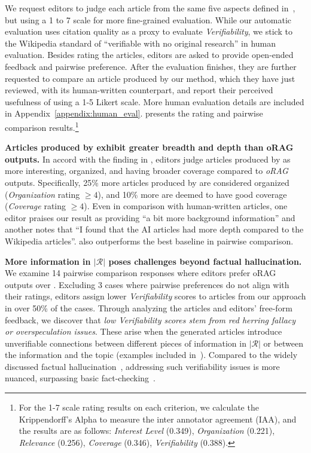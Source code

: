 We request editors to judge each article from the same five aspects defined in~, but using a 1 to 7 scale for more fine-grained evaluation. While our automatic evaluation uses citation quality as a proxy to evaluate \textit{Verifiability}, we stick to the Wikipedia standard of ``verifiable with no original research'' in human evaluation. 
Besides rating the articles, editors are asked to provide open-ended feedback and pairwise preference. After the evaluation finishes, they are further requested to compare an article produced by our method, which they have just reviewed, with its human-written counterpart, and report their perceived usefulness of \system using a 1-5 Likert scale. More human evaluation details are included in Appendix~\ref{appendix:human_eval}.  presents the rating and pairwise comparison results.\footnote{For the 1-7 scale rating results on each criterion, we calculate the Krippendorff's Alpha to measure the inter annotator agreement (IAA), and the results are as follows: \textit{Interest Level} (0.349), \textit{Organization} (0.221), \textit{Relevance} (0.256), \textit{Coverage} (0.346), \textit{Verifiability} (0.388).}

\noindent
\textbf{Articles produced by \system exhibit greater breadth and depth than oRAG outputs.} In accord with the finding in %
, editors judge articles produced by \system as more interesting, organized, and having broader coverage compared to %
\textit{oRAG} outputs. Specifically, 25\% more articles produced by \system are considered organized (\textit{Organization} rating $\geq 4$), and 10\% more are deemed to have good coverage (\textit{Coverage} rating $\geq 4$). Even in comparison with human-written articles, one editor praises our result as providing ``a bit more background information'' and another notes that ``I found that the AI articles had more depth compared to the Wikipedia articles''. \system also outperforms the best baseline in pairwise comparison.

\noindent
\textbf{More information in $|\mathcal{R}|$ poses challenges beyond factual hallucination.} We examine 14 pairwise comparison responses where editors prefer oRAG outputs over \system. Excluding 3 cases where pairwise preferences do not align with their ratings, editors assign lower \textit{Verifiability} scores to articles from our approach in over 50\% of the cases. Through analyzing the articles and editors' free-form feedback, 
we discover that \textit{low Verifiability scores stem from red herring fallacy or overspeculation issues}. These arise when the generated articles introduce unverifiable connections between different pieces of information in $|\mathcal{R}|$ or between the information and the topic (examples included in~). Compared to the widely discussed factual hallucination~\citep{shuster-etal-2021-retrieval-augmentation,huang2023survey}, addressing such verifiability issues is more nuanced, surpassing basic fact-checking~\citep{min-etal-2023-factscore}. %


